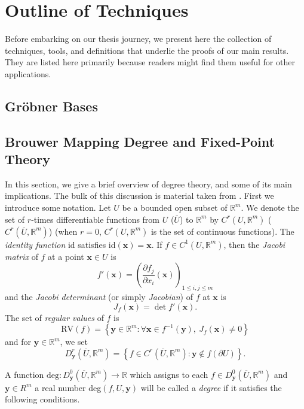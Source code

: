  \chapter{Outline of Techniques}

Before embarking on our thesis journey, we present here the collection of techniques, tools, and definitions that underlie the proofs of our main results.  They are listed here primarily because readers might find them useful for other applications.

\section{Gr\"obner Bases}



\section{Brouwer Mapping Degree and Fixed-Point Theory}

In this section, we give a brief overview of degree theory, and
some of its main implications.  The bulk of this discussion is material taken from \cite{degthy, teschl}.  First we introduce some notation.  Let $U$ be a bounded open subset of $\mathbb R^m$.  We denote the set of $r$-times differentiable functions from $U$ ($\overline{U}$) to $\mathbb R^m$ by $C^r(U,\mathbb R^m)$ ($C^r(\overline{U},\mathbb R^m)$) (when $r = 0$, $C^r(U,\mathbb R^m)$ is the set of continuous functions).  The \textit{identity function} id satisfies id$(\mathbf x) = \mathbf x$.  If $f \in C^1(U,\mathbb R^m)$, then the \textit{Jacobi matrix} of $f$ at a point $\mathbf {x} \in U$ is \[f'(\mathbf {x}) = \left(  \frac{\partial f_j}{\partial x_i}(\mathbf{x}) \right)_{1\leq i,j \leq m}\] and the \textit{Jacobi determinant} (or simply \textit{Jacobian}) of $f$ at $\mathbf{x}$ is \[ J_f(\mathbf{x}) = \det f'(\mathbf{x}).\]  The set of \textit{regular values} of $f$ is \[\text{RV}(f) = \left\{\mathbf{y}\in \mathbb R^m : \forall \mathbf{x} \in f^{-1}(\mathbf{y}), \ J_f(\mathbf{x}) \neq 0\right\}\] and for $\mathbf{y} \in \mathbb R^m$, we set \[D^r_{\mathbf{y}}(\overline{U},\mathbb R^m) = \left\{ f \in C^r( \overline{U},\mathbb R^m) : \mathbf{y} \notin f(\partial U) \right\} .\]  

A function $\text{deg}: D^{0}_{\mathbf{y}}(\overline{U},\mathbb R^m) \to \mathbb R$ which assigns to each $f \in D^{0}_{\mathbf{y}}(\overline{U},\mathbb R^m)$ and $\mathbf{y} \in R^m$ a real number deg$(f,U,\mathbf{y})$ will be called a \textit{degree} if it satisfies the following conditions.

